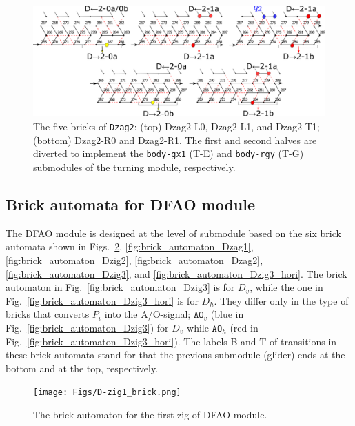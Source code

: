\documentclass[runningheads]{llncs}
\begin{document}
\begin{figure}[h]
\centering
\includegraphics[width=\linewidth]{Figs/DFAO-zag2.png}  
\caption{The five bricks of \texttt{Dzag2}: (top) Dzag2-L0, Dzag2-L1, and Dzag2-T1; (bottom) Dzag2-R0 and Dzag2-R1. 
The first and second halves are diverted to implement the \texttt{body-gx1} (T-E) and \texttt{body-rgy} (T-G) submodules of the turning module, respectively.}
\label{fig:Dzag2}
\end{figure}

\clearpage

	\subsection{Brick automata for DFAO module}
	\label{ap_subsect:DFAO_module_BA}

The DFAO module is designed at the level of submodule based on the six brick automata shown in Figs.~\ref{fig:brick_automaton_Dzig1}, \ref{fig:brick_automaton_Dzag1}, \ref{fig:brick_automaton_Dzig2}, \ref{fig:brick_automaton_Dzag2}, \ref{fig:brick_automaton_Dzig3}, and \ref{fig:brick_automaton_Dzig3_hori}. 
The brick automaton in Fig.~\ref{fig:brick_automaton_Dzig3} is for $D_v$, while the one in Fig.~\ref{fig:brick_automaton_Dzig3_hori} is for $D_h$. 
They differ only in the type of bricks that converts $P_i$ into the A/O-signal; $\mathtt{AO}_v$ (blue in Fig.~\ref{fig:brick_automaton_Dzig3}) for $D_v$ while $\mathtt{AO}_h$ (red in Fig.~\ref{fig:brick_automaton_Dzig3_hori}). 
The labels B and T of transitions in these brick automata stand for that the previous submodule (glider) ends at the bottom and at the top, respectively. 

\begin{figure}[ht]
\centering
\texttt{[image: Figs/D-zig1\_brick.png]}
\caption{The brick automaton for the first zig of DFAO module.}
\label{fig:brick_automaton_Dzig1}
\end{figure}
\end{document}
